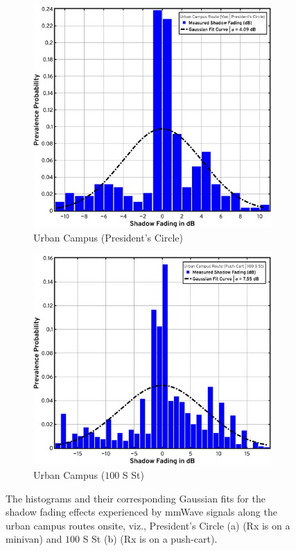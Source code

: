 \documentclass[12pt, draftcls, onecolumn]{IEEEtran}
\begin{document}
{\begin{figure} [t]
\begin{subfigure}{0.4815\linewidth}
        \includegraphics[width=1.0\linewidth]{figs/urban_campus_fading_1.pdf}
        \caption{Urban Campus (President's Circle)}
        \label{F9a}
    \end{subfigure}
    \begin{subfigure}{0.5085\linewidth}
        \centering
        \includegraphics[width=1.0\linewidth]{figs/urban_campus_fading_2.pdf}
        \caption{Urban Campus ($100$ S St)}
        \label{F9b}
    \end{subfigure}
    \vspace{-8mm}
    \caption{The histograms and their corresponding Gaussian fits for the shadow fading effects experienced by mmWave signals along the urban campus routes onsite, viz., President's Circle (a) (Rx is on a minivan) and $100$ S St (b) (Rx is on a push-cart).}
    \label{F9}
\end{figure}

}
\end{document}
